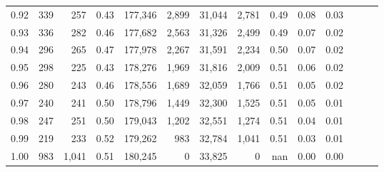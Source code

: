 \begin{tabular}{rrrrrrrrrrrrrr}
0.92 &    339 &    257 &  0.43 &  177,346 &    2,899 &  31,044 &   2,781 &  0.49 &  0.08 &      0.03 \\
0.93 &    336 &    282 &  0.46 &  177,682 &    2,563 &  31,326 &   2,499 &  0.49 &  0.07 &      0.02 \\
0.94 &    296 &    265 &  0.47 &  177,978 &    2,267 &  31,591 &   2,234 &  0.50 &  0.07 &      0.02 \\
0.95 &    298 &    225 &  0.43 &  178,276 &    1,969 &  31,816 &   2,009 &  0.51 &  0.06 &      0.02 \\
0.96 &    280 &    243 &  0.46 &  178,556 &    1,689 &  32,059 &   1,766 &  0.51 &  0.05 &      0.02 \\
0.97 &    240 &    241 &  0.50 &  178,796 &    1,449 &  32,300 &   1,525 &  0.51 &  0.05 &      0.01 \\
0.98 &    247 &    251 &  0.50 &  179,043 &    1,202 &  32,551 &   1,274 &  0.51 &  0.04 &      0.01 \\
0.99 &    219 &    233 &  0.52 &  179,262 &      983 &  32,784 &   1,041 &  0.51 &  0.03 &      0.01 \\
1.00 &    983 &  1,041 &  0.51 &  180,245 &        0 &  33,825 &       0 &   nan &  0.00 &      0.00 \\
\bottomrule
\end{tabular}
